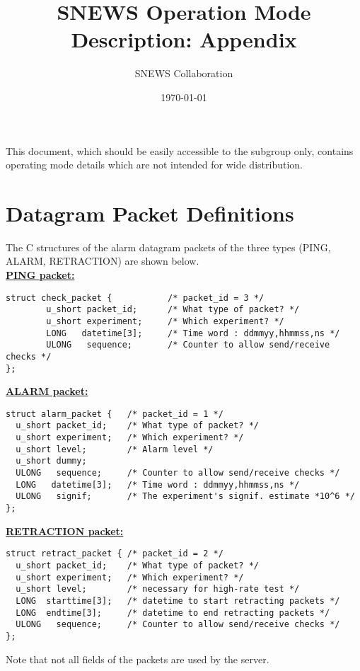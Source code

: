 \documentclass{article}
\begin{document}
\title{SNEWS Operation Mode Description: Appendix}         
\author{SNEWS Collaboration}
\date{\today}
\maketitle

This document, which should
be easily accessible to the subgroup only,
contains operating mode details which are not intended
for wide distribution.  

\section{Datagram Packet Definitions}      

The C structures of the alarm datagram packets of the three types 
(PING, ALARM, RETRACTION) are shown below.\\


\noindent
\underline{\textbf{PING packet:}}

\begin{verbatim}
struct check_packet {           /* packet_id = 3 */
        u_short packet_id;      /* What type of packet? */  
        u_short experiment;     /* Which experiment? */
        LONG   datetime[3];     /* Time word : ddmmyy,hhmmss,ns */
        ULONG   sequence;       /* Counter to allow send/receive checks */
};
\end{verbatim}

\noindent
\underline{\textbf{ALARM packet:}}

\begin{verbatim}
struct alarm_packet {   /* packet_id = 1 */
  u_short packet_id;    /* What type of packet? */  
  u_short experiment;   /* Which experiment? */
  u_short level;        /* Alarm level */
  u_short dummy;
  ULONG   sequence;     /* Counter to allow send/receive checks */
  LONG   datetime[3];   /* Time word : ddmmyy,hhmmss,ns */
  ULONG   signif;       /* The experiment's signif. estimate *10^6 */
};

\end{verbatim}

\noindent
\underline{\textbf{RETRACTION packet:}}

\begin{verbatim}
struct retract_packet { /* packet_id = 2 */ 
  u_short packet_id;    /* What type of packet? */   
  u_short experiment;   /* Which experiment? */ 
  u_short level;        /* necessary for high-rate test */ 
  LONG  starttime[3];   /* datetime to start retracting packets */ 
  LONG  endtime[3];     /* datetime to end retracting packets */ 
  ULONG   sequence;     /* Counter to allow send/receive checks */ 
}; 

\end{verbatim}
Note that not all fields of the packets are used by the server.
\end{document}
